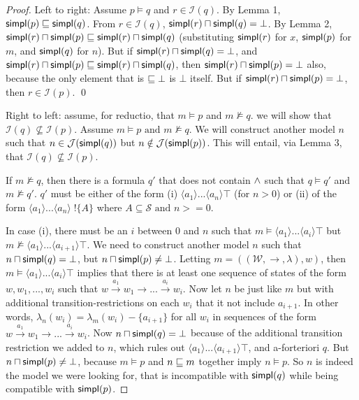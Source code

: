 \begin{proof}

Left to right: Assume $p \models q$ and $r \in \mathcal{I}(q)$.  By
Lemma 1, $\mathsf{simpl}(p) \sqsubseteq \mathsf{simpl}(q)$.  From $r \in \mathcal{I}(q)$,
$\mathsf{simpl}(r) \sqcap \mathsf{simpl}(q) = \bot$.  By Lemma 2, $\mathsf{simpl}(r) \sqcap
\mathsf{simpl}(p) \sqsubseteq \mathsf{simpl}(r) \sqcap \mathsf{simpl}(q)$ (substituting $\mathsf{simpl}(r)$
for $x$, $\mathsf{simpl}(p)$ for $m$, and $\mathsf{simpl}(q)$ for $n$).  But if
$\mathsf{simpl}(r) \sqcap \mathsf{simpl}(q) = \bot$, and $\mathsf{simpl}(r) \sqcap \mathsf{simpl}(p)
\sqsubseteq \mathsf{simpl}(r) \sqcap \mathsf{simpl}(q)$, then $\mathsf{simpl}(r) \sqcap \mathsf{simpl}(p) =
\bot$ also, because the only element that is $\sqsubseteq \bot$ is $\bot$
itself.  But if $\mathsf{simpl}(r) \sqcap \mathsf{simpl}(p) = \bot$, then $r \in
\mathcal{I}(p)$.  \qed

Right to left: assume, for reductio, that $m \models p$ and $m \nvDash
q$. we will show that $\mathcal{I}(q) \nsubseteq \mathcal{I}(p)$.
Assume $m \models p \mbox{ and } m \nvDash q$. We will construct
another model $n$ such that $n \in \mathcal{J}(\mathsf{simpl}(q))$ but $n
\notin \mathcal{J}(\mathsf{simpl}(p))$.  This will entail, via Lemma 3, that
$\mathcal{I}(q) \nsubseteq \mathcal{I}(p)$.

If $m \nvDash q$, then there is a formula $q'$ that does not contain
$\land$ such that $q \models q'$ and $m \nvDash q'$. $q'$ must be
either of the form (i) $\langle a_1 \rangle ... \langle a_n \rangle
\top$ (for $n > 0$) or (ii) of the form $\langle a_1 \rangle
... \langle a_n \rangle \; !\{A\}$ where $A \subseteq \mathcal{S}
\mbox{ and } n >= 0$.

In case (i), there must be an $i$ between $0$ and $n$ such that $m
\models \langle a_1 \rangle ... \langle a_i \rangle \top$ but $m
\nvDash \langle a_1 \rangle ... \langle a_{i+1} \rangle \top$. We need
to construct another model $n$ such that $n \sqcap \mathsf{simpl}(q) = \bot$,
but $n \sqcap \mathsf{simpl}(p) \neq \bot$. Letting $m =
((\mathcal{W},\rightarrow,\lambda),w)$, then $m \models \langle a_1
\rangle ... \langle a_i \rangle \top$ implies that there is at least
one sequence of states of the form $w, w_1, ..., w_i$ such that $w
\xrightarrow{a_1} w_1 \rightarrow ... \xrightarrow{a_i} w_i$.  Now let
$n$ be just like $m$ but with additional transition-restrictions on
each $w_i$ that it not include $a_{i+1}$.  In other words,
$\lambda_n(w_i) = \lambda_m(w_i) - \{a_{i+1}\}$ for all $w_i$ in
sequences of the form $w \xrightarrow{a_1} w_1 \rightarrow
... \xrightarrow{a_i} w_i$. Now $n \sqcap \mathsf{simpl}(q) = \bot$ because of
the additional transition restriction we added to $n$, which rules out
$\langle a_1 \rangle ... \langle a_{i+1} \rangle \top$, and
a-forteriori $q$. But $n \sqcap \mathsf{simpl}(p) \neq \bot$, because $m
\models p$ and $n \sqsubseteq m$ together imply $n \models p$. So $n$ is
indeed the model we were looking for, that is incompatible with
$\mathsf{simpl}(q)$ while being compatible with $\mathsf{simpl}(p)$.


\end{proof}
